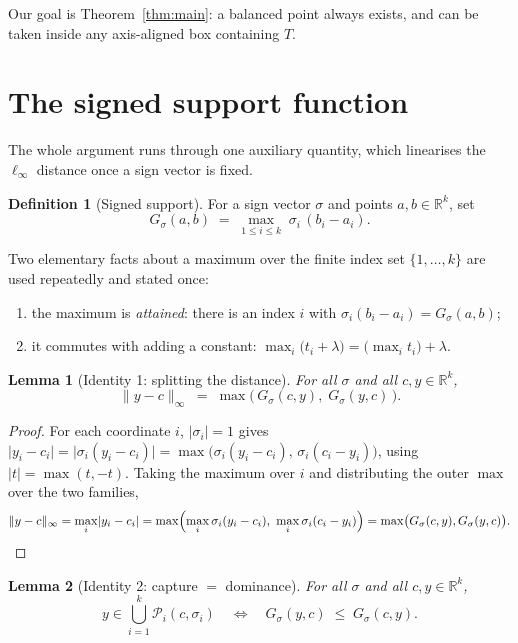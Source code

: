 \documentclass[11pt]{article}
\theoremstyle{plain}
\newtheorem{lemma}{Lemma}
\theoremstyle{definition}
\newtheorem{definition}{Definition}
\theoremstyle{remark}
\newcommand{\R}{\mathbb{R}}
\newcommand{\Rk}{\R^{k}}
\newcommand{\linf}[1]{\lVert #1 \rVert_{\infty}}
\newcommand{\abs}[1]{\lvert #1 \rvert}
\newcommand{\Pyr}{\mathcal{P}}
\newcommand{\sgn}{\sigma}
\begin{document}
Our goal is Theorem~\ref{thm:main}: a balanced point always exists, and can be
taken inside any axis-aligned box containing $T$.

\section{The signed support function}

The whole argument runs through one auxiliary quantity, which linearises the
$\ell_\infty$ distance once a sign vector is fixed.

\begin{definition}[Signed support]\label{def:sgnsup}
For a sign vector $\sgn$ and points $a,b\in\Rk$, set
\[
  G_\sgn(a,b)\;=\;\max_{1\le i\le k}\;\sgn_i\,(b_i-a_i).
\]
\end{definition}

Two elementary facts about a maximum over the finite index set $\{1,\dots,k\}$
are used repeatedly and stated once:
\begin{enumerate}
\item[(M1)] the maximum is \emph{attained}: there is an index $i$ with
  $\sgn_i(b_i-a_i)=G_\sgn(a,b)$;
\item[(M2)] it commutes with adding a constant:
  $\max_i\bigl(t_i+\lambda\bigr)=\bigl(\max_i t_i\bigr)+\lambda$.
\end{enumerate}

\begin{lemma}[Identity 1: splitting the distance]\label{lem:id1}
For all $\sgn$ and all $c,y\in\Rk$,
\[
  \linf{y-c}\;=\;\max\bigl(\,G_\sgn(c,y),\;G_\sgn(y,c)\,\bigr).
\]
\end{lemma}

\begin{proof}
For each coordinate $i$, $\abs{\sgn_i}=1$ gives
$\abs{y_i-c_i}=\abs{\sgn_i(y_i-c_i)}=\max\bigl(\sgn_i(y_i-c_i),\,\sgn_i(c_i-y_i)\bigr)$,
using $\abs{t}=\max(t,-t)$. Taking the maximum over $i$ and distributing the
outer $\max$ over the two families,
\[
  \linf{y-c}=\max_i \abs{y_i-c_i}
  =\max\Bigl(\max_i \sgn_i(y_i-c_i),\ \max_i \sgn_i(c_i-y_i)\Bigr)
  =\max\bigl(G_\sgn(c,y),G_\sgn(y,c)\bigr).\qedhere
\]
\end{proof}

\begin{lemma}[Identity 2: capture $=$ dominance]\label{lem:id2}
For all $\sgn$ and all $c,y\in\Rk$,
\[
  y\in\bigcup_{i=1}^{k}\Pyr_i(c,\sgn_i)
  \quad\Longleftrightarrow\quad
  G_\sgn(y,c)\;\le\;G_\sgn(c,y).
\]
\end{lemma}
\end{document}
